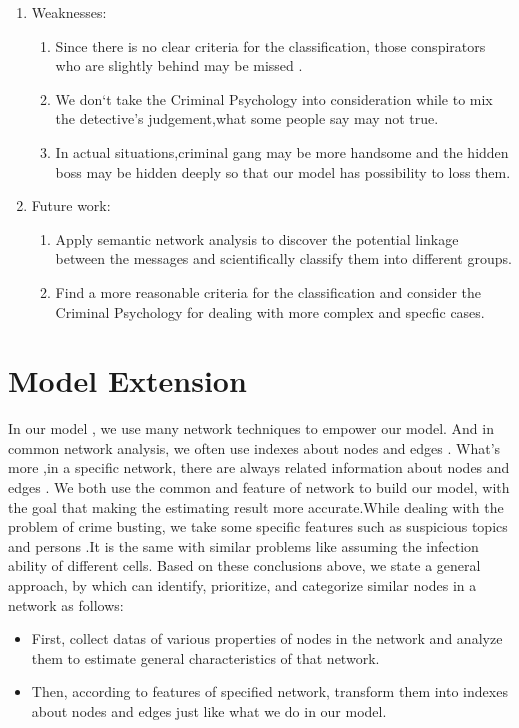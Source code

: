 \documentclass[12pt]{article}
\begin{document}
\begin{itemize}
\begin{itemize}
\begin{enumerate}
\item Weaknesses:  
\begin{enumerate}
\item Since there is no clear criteria for the classification, those conspirators who are slightly behind may be missed . 
\item We don‘t take the Criminal Psychology into consideration while to mix the detective’s judgement,what some people say may not true.
\item In actual situations,criminal gang may be more handsome and the hidden boss may be hidden deeply so that our model has possibility to loss them.
\end{enumerate}

\item Future work: 
\begin{enumerate}
\item Apply semantic network analysis to discover the potential linkage between the messages and scientifically classify them into different groups. 
\item Find a more reasonable criteria for the classification and consider the Criminal Psychology for dealing with more complex and specfic cases.
\end{enumerate}
\end{enumerate}

\section{Model Extension}
In our model , we use many network techniques to empower our model. And in common network analysis, we often use indexes about nodes and edges . What’s more ,in a specific network, there are always related information about nodes and edges . We both use the common and feature of network to build our model, with the goal that making the estimating result more accurate.While dealing with the problem of crime busting, we take some specific features such as suspicious topics and persons .It is the same with similar problems like assuming the infection ability of different cells.
Based on these conclusions above, we state a general approach, by which can identify, prioritize, and categorize similar nodes in a network as follows: 
\begin{itemize}
\item First, collect datas of various properties of nodes in the network and analyze them to estimate general characteristics of that network. 

\item Then, according to features of specified network, transform them into indexes about nodes and edges just like what we do in our model. 


\end{itemize}
\end{itemize}
\end{itemize}
\end{document}
